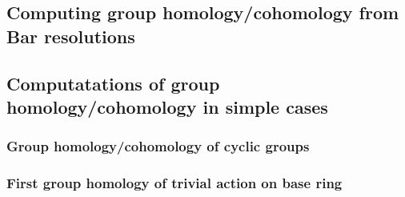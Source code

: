 \subsection{Computing group homology/cohomology from Bar resolutions}








\subsection{Computatations of group homology/cohomology in simple cases}





\subsubsection{Group homology/cohomology of cyclic groups}




\subsubsection{First group homology of trivial action on base ring}









